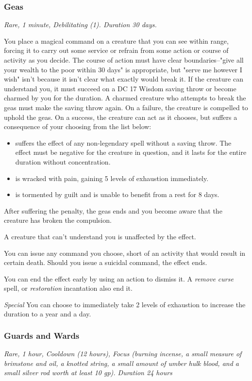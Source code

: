 \subsubsection{Geas}
\textit{Rare, 1 minute, Debilitating (1). Duration 30 days.}

You place a magical command on a creature that you can see within range, forcing it to carry out some service or refrain from some action or course of activity as you decide. The course of action must have clear boundaries--"give all your wealth to the poor within 30 days" is appropriate, but "serve me however I wish" isn't because it isn't clear what exactly would break it. If the creature can understand you, it must succeed on a DC 17 Wisdom saving throw or become charmed by you for the duration. A charmed creature who attempts to break the geas must make the saving throw again. On a failure, the creature is compelled to uphold the geas. On a success, the creature can act as it chooses, but suffers a consequence of your choosing from the list below:
\begin{itemize}
\item suffers the effect of any non-legendary spell without a saving throw. The effect must be negative for the creature in question, and it lasts for the entire duration without concentration.
\item is wracked with pain, gaining 5 levels of exhaustion immediately.
\item is tormented by guilt and is unable to benefit from a rest for 8 days.
\end{itemize}

After suffering the penalty, the geas ends and you become aware that the creature has broken the compulsion.

A creature that can't understand you is unaffected by the effect.

You can issue any command you choose, short of an activity that would result in certain death. Should you issue a suicidal command, the effect ends.

You can end the effect early by using an action to dismiss it. A \textit{remove curse} spell, or \textit{restoration} incantation also end it.

\textit{Special} You can choose to immediately take 2 levels of exhaustion to increase the duration to a year and a day.

\subsubsection{Guards and Wards}
\textit{Rare, 1 hour, Cooldown (12 hours), Focus (burning incense, a small measure of brimstone and oil, a knotted string, a small amount of umber hulk blood, and a small silver rod worth at least 10 gp). Duration 24 hours}

